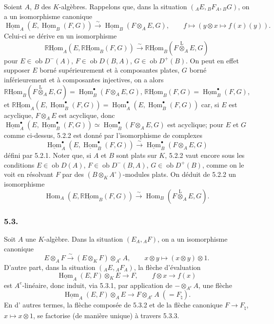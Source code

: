 \documentclass[11pt]{article}
\DeclareMathOperator{\Hom}{Hom}
\newcommand{\R}{\mathbb{R}}\newcommand{\RHomCore}{\mathbb{R}\mathrm{Hom}}
\newcommand{\ob}{\operatorname{ob}}
\providecommand{\RHom}{\RHomCore}
\providecommand{\uRHom}{\underline{\RHom}}
\providecommand{\uHom}{\underline{\Hom}}
\providecommand{\lten}{\overset{\mathrm L}{\otimes}}
\providecommand{\RHom}{\RHomCore}
\providecommand{\Hom}{\operatorname{Hom}}
\providecommand{\ob}{\operatorname{ob}}
\providecommand{\lten}{\overset{\mathrm L}{\otimes}}
\providecommand{\RHom}{\R\mathcal{H}om}
\providecommand{\lten}{\overset{\mathrm L}{\otimes}}
\providecommand{\R}{\mathrm R}
\providecommand{\lten}{\overset{\mathrm L}{\otimes}}
\providecommand{\lten}{\overset{\mathrm L}{\otimes}}
\providecommand{\lten}{\overset{\mathrm L}{\otimes}}
\providecommand{\RHom}{\RHomCore}
\providecommand{\Hom}{\operatorname{Hom}}
\providecommand{\lten}{\overset{\mathrm L}{\otimes}}
\begin{document}
Soient $A$, $B$ des $K$-algèbres. Rappelons que, dans la situation $({}_AE,{}_BF_A,{}_BG)$, on a un isomorphisme canonique
\begin{equation}\tag{5.2.1}
\uHom_A(E,\uHom_B(F,G))\xrightarrow{\sim}\uHom_B(F\otimes_AE,G),\qquad
f\longmapsto (y\otimes x\longmapsto f(x)(y)).
\end{equation}
Celui-ci se dérive en un isomorphisme
\begin{equation}\tag{5.2.2}
\uRHom_A(E,\uRHom_B(F,G))\xrightarrow{\sim}\uRHom_B(F\lten_AE,G)
\end{equation}
pour $E\in\ob D^-(A)$, $F\in\ob D(B,A)$, $G\in\ob D^+(B)$. On peut en effet supposer $E$ borné supérieurement et à composantes plates, $G$ borné inférieurement et à composantes injectives, on a alors $\uRHom_B(F\lten_AE,G)=\uHom_B^\bullet(F\otimes_AE,G)$, $\uRHom_B(F,G)=\uHom_B^\bullet(F,G)$, et $\uRHom_A(E,\uHom_B^\bullet(F,G))=\uHom_A^\bullet(E,\uHom_B^\bullet(F,G))$ car, si $E$ est acyclique, $F\otimes_AE$ est acyclique, donc $\uHom_A^\bullet(E,\uHom_B^\bullet(F,G))\simeq\uHom_B^\bullet(F\otimes_AE,G)$ est acyclique; pour $E$ et $G$ comme ci-dessus, 5.2.2 est donné par l'isomorphisme de complexes
\[
\uHom_A^\bullet(E,\uHom_B^\bullet(F,G))\xrightarrow{\sim}\uHom_B^\bullet(F\otimes_AE,G)
\]
défini par 5.2.1. Noter que, si $A$ et $B$ sont plats sur $K$, 5.2.2 vaut encore sous les conditions $E\in\ob D(A)$, $F\in\ob D^-(B,A)$, $G\in\ob D^+(B)$, comme on le voit en résolvant $F$ par des $(B\otimes_KA^\circ)$-modules plats. On déduit de 5.2.2 un isomorphisme
\begin{equation}\tag{5.2.3}
\Hom_A(E,\uRHom_B(F,G))\xrightarrow{\sim}\Hom_B(F\lten_AE,G).
\end{equation}

\subsubsection*{5.3.}

Soit $A$ une $K$-algèbre. Dans la situation $(E_A,{}_AF)$, on a un isomorphisme canonique
\begin{equation}\tag{5.3.1}
E\otimes_AF\xrightarrow{\sim}(E\otimes_KF)\otimes_{A^e}A,
\qquad x\otimes y\longmapsto (x\otimes y)\otimes 1.
\end{equation}
D'autre part, dans la situation $({}_AE,{}_AF_A)$, la flèche d'évaluation
\begin{equation}\tag{5.3.2}
\uHom_A(E,F)\otimes_KE\longrightarrow F,
\qquad f\otimes x\longrightarrow f(x)
\end{equation}
est $A^e$-linéaire, donc induit, via 5.3.1, par application de $-\otimes_{A^e}A$, une flèche
\begin{equation}\tag{5.3.3}
\uHom_A(E,F)\otimes_AE\longrightarrow F\otimes_{A^e}A\;(=F_\natural).
\end{equation}
En d'%
autres termes, la flèche composée de 5.3.2 et de la flèche canonique $F\to F_\natural$, $x\mapsto x\otimes 1$, se factorise (de manière unique) à travers 5.3.3.
\end{document}
